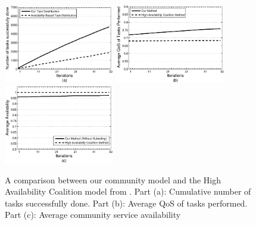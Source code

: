 \begin{figure}%
\centering
\includegraphics[width=1.9in]{Figures/avg_task_ws_done.eps}
\includegraphics[width=1.9in]{Figures/avg_qos_ws_done.eps}
\includegraphics[width=1.9in]{Figures/avg_avail_ws_done.eps}
\caption{A comparison between our community model and the High
Availability Coalition model from \cite{10.1109/TSC.2012.12}. Part
(a): Cumulative number of tasks successfully done. Part (b):
Average QoS of tasks performed. Part (c): Average community
service availability} \label{fig_avail_method}
\end{figure}

